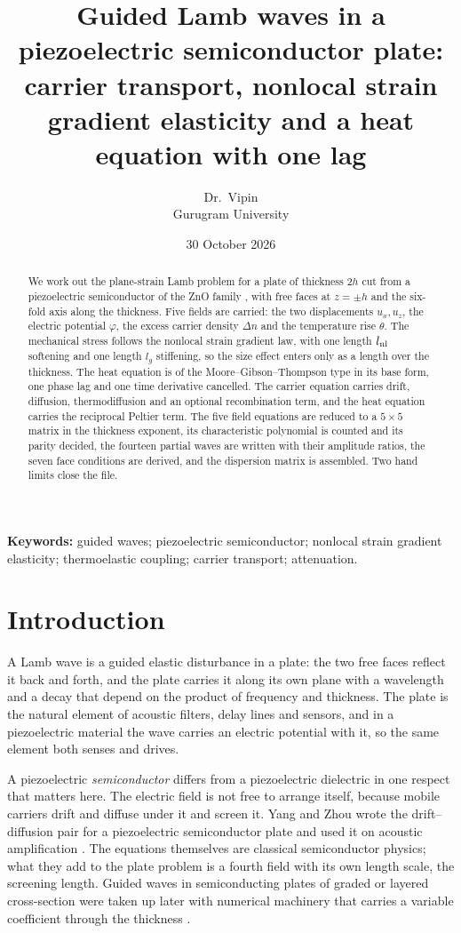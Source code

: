 \documentclass[11pt]{article}
\title{\vspace{-1.2cm}Guided Lamb waves in a piezoelectric semiconductor plate:\\
carrier transport, nonlocal strain gradient elasticity and a heat equation with one lag}
\author{Dr.\ Vipin \\ Gurugram University}
\date{30 October 2026}
\begin{document}
\maketitle

\begin{abstract}
\noindent
We work out the plane-strain Lamb problem for a plate of thickness $2h$ cut from a piezoelectric
semiconductor of the ZnO family \cite{Ozgur2005}, with free faces at $z=\pm h$ and the six-fold axis along the thickness.
Five fields are carried: the two displacements $u_x,u_z$, the electric potential $\varphi$, the excess
carrier density $\Delta n$ and the temperature rise $\theta$. The mechanical stress follows the nonlocal
strain gradient law, with one length $l_{\rm nl}$ softening and one length $l_g$ stiffening, so the size
effect enters only as a length over the thickness. The heat equation is of the Moore--Gibson--Thompson
type in its base form, one phase lag and one time derivative cancelled. The carrier equation carries
drift, diffusion, thermodiffusion and an optional recombination term, and the heat equation carries the
reciprocal Peltier term. The five field equations are reduced to a $5\times5$ matrix in the thickness
exponent, its characteristic polynomial is counted and its parity decided, the fourteen partial waves are
written with their amplitude ratios, the seven face conditions are derived, and the dispersion matrix is
assembled. Two hand limits close the file.
\end{abstract}

\noindent\textbf{Keywords:} guided waves; piezoelectric semiconductor; nonlocal strain gradient elasticity;
thermoelastic coupling; carrier transport; attenuation.

\section{Introduction}

A Lamb wave is a guided elastic disturbance in a plate: the two free faces reflect it back and forth, and
the plate carries it along its own plane with a wavelength and a decay that depend on the product of
frequency and thickness. The plate is the natural element of acoustic filters, delay lines and sensors,
and in a piezoelectric material the wave carries an electric potential with it, so the same element both
senses and drives.

A piezoelectric \emph{semiconductor} differs from a piezoelectric dielectric in one respect that matters
here. The electric field is not free to arrange itself, because mobile carriers drift and diffuse under it
and screen it. Yang and Zhou wrote the drift--diffusion pair for a piezoelectric semiconductor plate and
used it on acoustic amplification
\cite[Eqs.~(3), (7)]{YangZhou2005}. The equations themselves are classical semiconductor physics; what
they add to the plate problem is a fourth field with its own length scale, the screening length. Guided
waves in semiconducting plates of graded or layered cross-section were taken up later with numerical
machinery that carries a variable coefficient through the thickness \cite{Othmani2017}.
\end{document}
